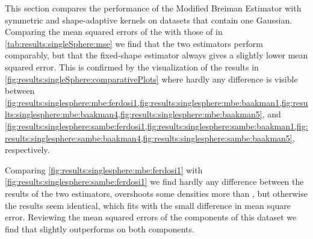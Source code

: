 
\begin{figure*}
	\centering
	
	\caption{Plot of the density as estimated by - \mbe and - \sambe as a function of the known density of the datasets with a single Gaussian.}
	\label{fig:results:singleSphere:comparativePlots}
\end{figure*}

\begin{table}
	\centering
	
	\caption{Performance of the Modified Breiman Estimator with fixed-shaped and shape-adaptive kernels on the datasets with a single Gaussian.} 	
	\label{tab:results:singleSphere:mse}
\end{table}

\begin{table}
	\centering
	
	\caption{The mean and the standard deviation of the anisotropy of the kernels used for the dataset with a single Gaussian.}
	\label{tab:results:singleSphere:anisotropy}
\end{table}

This section compares the performance of the Modified Breiman Estimator with symmetric and shape-adaptive kernels on datasets that contain one Gaussian. Comparing the mean squared errors of the \mbe with those of \sambe in \cref{tab:results:singleSphere:mse} we find that the two estimators perform comparably, but that the fixed-shape estimator always gives a slightly lower mean squared error. This is confirmed by the visualization of the results in \cref{fig:results:singleSphere:comparativePlots} where hardly any difference is visible between \cref{fig:results:singlesphere:mbe:ferdosi1,fig:results:singlesphere:mbe:baakman1,fig:results:singlesphere:mbe:baakman4,fig:results:singlesphere:mbe:baakman5}, and \cref{fig:results:singlesphere:sambe:ferdosi1,fig:results:singlesphere:sambe:baakman1,fig:results:singlesphere:sambe:baakman4,fig:results:singlesphere:sambe:baakman5}, respectively.

		Comparing \cref{fig:results:singlesphere:mbe:ferdosi1} with \cref{fig:results:singlesphere:sambe:ferdosi1} we find hardly any difference between the results of the two estimators, \sambe overshoots some densities more than \mbe, but otherwise the results seem identical, which fits with the small difference in mean square error. 
		Reviewing the mean squared errors of the components of this dataset we find that \mbe slightly outperforms \sambe on both components.

